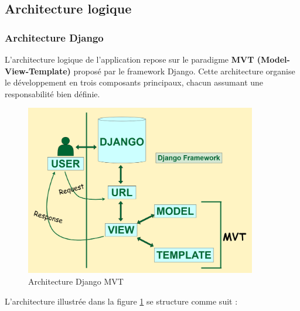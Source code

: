 \subsection{Architecture logique}
\subsubsection{Architecture Django}
L’architecture logique de l’application repose sur le paradigme \textbf{MVT (Model-View-Template)} proposé par le framework Django. Cette architecture organise le développement en trois composants principaux, chacun assumant une responsabilité bien définie.

\begin{figure}[H]
    \centering
    \includegraphics[width=0.9\textwidth]{figures/django architecture.png}
    \caption{Architecture Django MVT}
    \label{fig:architecture_mvt}
\end{figure}

L’architecture illustrée dans la figure \ref{fig:architecture_mvt} se structure comme suit :

